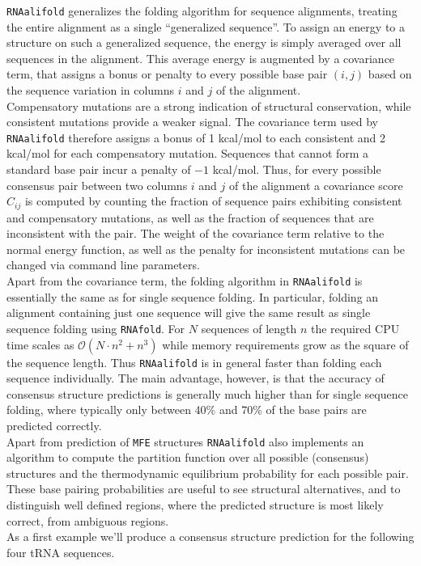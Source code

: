 \documentclass[]{article}
\begin{document}
\texttt{RNAalifold} generalizes the folding algorithm for sequence
alignments, treating the entire alignment as a single ``generalized
sequence''. To assign an energy to a structure on such a generalized
sequence, the energy is simply averaged over all sequences in the
alignment. This average energy is augmented by a covariance term, that
assigns a bonus or penalty to every possible base pair
\(\left( {i,j} \right)\) based on the sequence variation in columns
\(i\) and \(j\) of the alignment.\\
Compensatory mutations are a strong indication of structural
conservation, while consistent mutations provide a weaker signal. The
covariance term used by \texttt{RNAalifold} therefore assigns a bonus of
1 kcal/mol to each consistent and 2 kcal/mol for each compensatory
mutation. Sequences that cannot form a standard base pair incur a
penalty of \(- 1\) kcal/mol. Thus, for every possible consensus pair
between two columns \(i\) and \(j\) of the alignment a covariance score
\(C_{ij}\) is computed by counting the fraction of sequence pairs
exhibiting consistent and compensatory mutations, as well as the
fraction of sequences that are inconsistent with the pair. The weight of
the covariance term relative to the normal energy function, as well as
the penalty for inconsistent mutations can be changed via command line
parameters.\\
 Apart from the covariance term, the folding algorithm in
\texttt{RNAalifold} is essentially the same as for single sequence
folding. In particular, folding an alignment containing just one
sequence will give the same result as single sequence folding using
\texttt{RNAfold}. For \(N\) sequences of length \(n\) the required CPU
time scales as
\(\mathcal{\mathcal{O}}\left( {N \cdot n^{2} + n^{3}} \right)\) while
memory requirements grow as the square of the sequence length. Thus
\texttt{RNAalifold} is in general faster than folding each sequence
individually. The main advantage, however, is that the accuracy of
consensus structure predictions is generally much higher than for single
sequence folding, where typically only between 40\% and 70\% of the base
pairs are predicted correctly.\\
 Apart from prediction of \texttt{MFE} structures \texttt{RNAalifold}
also implements an algorithm to compute the partition function over all
possible (consensus) structures and the thermodynamic equilibrium
probability for each possible pair. These base pairing probabilities are
useful to see structural alternatives, and to distinguish well defined
regions, where the predicted structure is most likely correct, from
ambiguous regions.\\
 As a first example we'll produce a consensus structure prediction for
the following four tRNA sequences.
\end{document}
